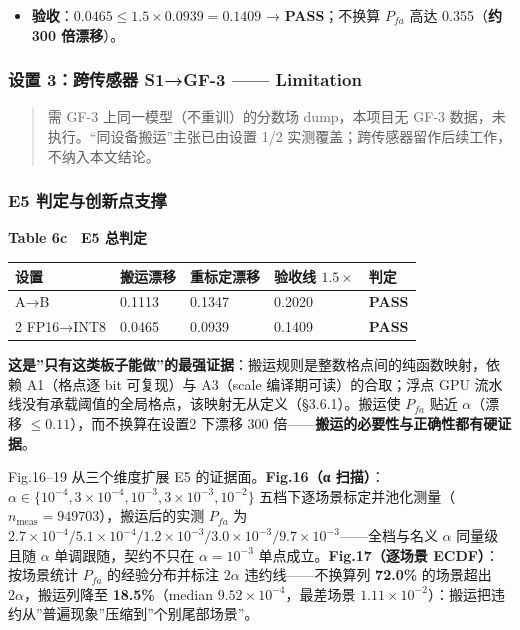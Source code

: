 \begin{itemize}
\tightlist
\item
  \textbf{验收}：\(0.0465\le1.5\times0.0939=0.1409\) →
  \textbf{PASS}；不换算 \(P_{fa}\) 高达 0.355（\textbf{约 300
  倍漂移}）。
\end{itemize}

\subsubsection{设置 3：跨传感器 S1→GF-3 ------
Limitation}\label{ux8bbeux7f6e-3ux8de8ux4f20ux611fux5668-s1gf-3-limitation}

\begin{quote}
需 GF-3 上同一模型（不重训）的分数场 dump，本项目无 GF-3
数据，未执行。``同设备搬运''主张已由设置 1/2
实测覆盖；跨传感器留作后续工作，不纳入本文结论。
\end{quote}

\subsubsection{E5
判定与创新点支撑}\label{e5-ux5224ux5b9aux4e0eux521bux65b0ux70b9ux652fux6491}

\textbf{Table 6c　E5 总判定}

{\def\LTcaptype{none} %
\begin{longtable}[]{@{}lllll@{}}
\toprule\noalign{}
设置 & 搬运漂移 & 重标定漂移 & 验收线 \(1.5\times\) & 判定 \\
\midrule\noalign{}
\endhead
\bottomrule\noalign{}
\endlastfoot
1 A→B & 0.1113 & 0.1347 & 0.2020 & \textbf{PASS} \\
2 FP16→INT8 & 0.0465 & 0.0939 & 0.1409 & \textbf{PASS} \\
\end{longtable}
}

\textbf{这是''只有这类板子能做''的最强证据}：搬运规则是整数格点间的纯函数映射，依赖
A1（格点逐 bit 可复现）与 A3（scale 编译期可读）的合取；浮点 GPU
流水线没有承载阈值的全局格点，该映射无从定义（§3.6.1）。搬运使
\(P_{fa}\) 贴近 \(\alpha\)（漂移 \(\le0.11\)），而不换算在设置2 下漂移
300 倍------\textbf{搬运的必要性与正确性都有硬证据}。

Fig.16--19 从三个维度扩展 E5 的证据面。\textbf{Fig.16（α
扫描）}：\(\alpha\in\{10^{-4},3{\times}10^{-4},10^{-3},3{\times}10^{-3},10^{-2}\}\)
五档下逐场景标定并池化测量（\(n_{\mathrm{meas}}=949703\)），搬运后的实测
\(P_{fa}\) 为
\(2.7{\times}10^{-4}/5.1{\times}10^{-4}/1.2{\times}10^{-3}/3.0{\times}10^{-3}/9.7{\times}10^{-3}\)------全档与名义
\(\alpha\) 同量级且随 \(\alpha\) 单调跟随，契约不只在 \(\alpha=10^{-3}\)
单点成立。\textbf{Fig.17（逐场景 ECDF）}：按场景统计 \(P_{fa}\)
的经验分布并标注 \(2\alpha\) 违约线------不换算列 \textbf{72.0\%}
的场景超出 \(2\alpha\)，搬运列降至 \textbf{18.5\%}（median
\(9.52{\times}10^{-4}\)，最差场景
\(1.11{\times}10^{-2}\)）：搬运把违约从''普遍现象''压缩到''个别尾部场景''。

